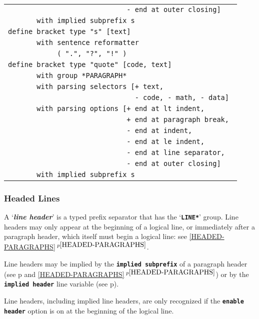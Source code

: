\documentclass[12pt]{article}
\newcommand{\TT}[1]{{\tt \bfseries #1}}
\newcommand{\key}[1]{{\bf \em #1}\index{#1}}
\newcommand{\itemref}[1]{\ref{#1}$\,^{p\pageref{#1}}$}
\newcommand{\pagref}[1]{p\pageref{#1}}
\begin{document}
\begin{center}
\begin{tabular}{l}
\tt ~~~~~~~~~~~~~~~~~~~~~~~~~~~~~- end at outer closing] \\
\tt ~~~~~~~with implied subprefix {s} \\
\tt define bracket type "s" [text] \\
\tt ~~~~~~~with sentence reformatter \\
\tt ~~~~~~~~~~~~( ".", "?", "!" ) \\
\tt define bracket type "quote" [code, text] \\
\tt ~~~~~~~with group *PARAGRAPH* \\
\tt ~~~~~~~with parsing selectors [+ text, \\
\tt ~~~~~~~~~~~~~~~~~~~~~~~~~~~~~~~- code, - math, - data] \\
\tt ~~~~~~~with parsing options [+ end at lt indent, \\
\tt ~~~~~~~~~~~~~~~~~~~~~~~~~~~~~+ end at paragraph break, \\
\tt ~~~~~~~~~~~~~~~~~~~~~~~~~~~~~- end at indent, \\
\tt ~~~~~~~~~~~~~~~~~~~~~~~~~~~~~- end at le indent, \\
\tt ~~~~~~~~~~~~~~~~~~~~~~~~~~~~~- end at line separator, \\
\tt ~~~~~~~~~~~~~~~~~~~~~~~~~~~~~- end at outer closing] \\
\tt ~~~~~~~with implied subprefix {s} \\
\end{tabular}

\end{center}


\subsubsection{Headed Lines}
\label{HEADED-LINES}

A `\key{line header}' is a typed prefix separator that has
the `\TT{*LINE*}' group.  Line headers may only
appear at the beginning of a logical line, or immediately
after a paragraph header, which itself must begin a logical
line: see \itemref{HEADED-PARAGRAPHS}.

Line headers may be implied by the \TT{implied subprefix}
of a paragraph header (see \pagref{IMPLIED-SUBPREFIX}
and \itemref{HEADED-PARAGRAPHS})
or by the \TT{implied header} line variable (see \pagref{IMPLIED-HEADER}).

Line headers, including implied line headers,
are only recognized if the \TT{enable header}
option is on at the beginning of the logical line.
\end{document}
